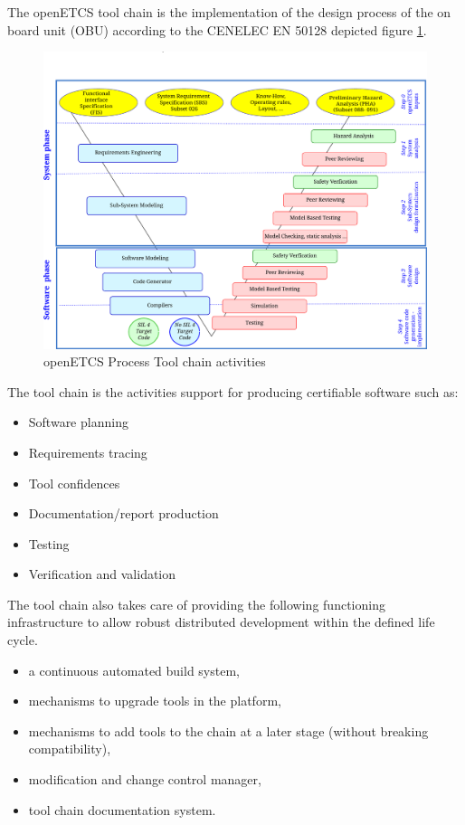 \documentclass{openetcs_report}
\begin{document}
The openETCS tool chain is the implementation of the design process of the on board unit (OBU)
according to the CENELEC EN 50128 depicted figure \ref{fig:lifecycle}.
\begin{figure}[htbp]
  \centering
  \includegraphics[width=\textwidth]{images/WholeProcess_Activities}
  \caption{openETCS Process Tool chain activities}
  \label{fig:lifecycle}
\end{figure}
 
The tool chain is the activities support for producing certifiable
software such as:
\begin{itemize}
\item  Software planning
\item  Requirements tracing
\item  Tool confidences
\item  Documentation/report production
\item  Testing
\item Verification and validation
\end{itemize}
The tool chain also takes care of providing the following functioning infrastructure to allow
robust distributed development within the defined life cycle.
\begin{itemize}
\item  a continuous automated build system,
\item  mechanisms to upgrade tools in the platform,
\item  mechanisms to add tools to the chain at a later stage (without breaking compatibility),
\item  modification and change control manager,
\item  tool chain documentation system.
\end{itemize}
\end{document}
